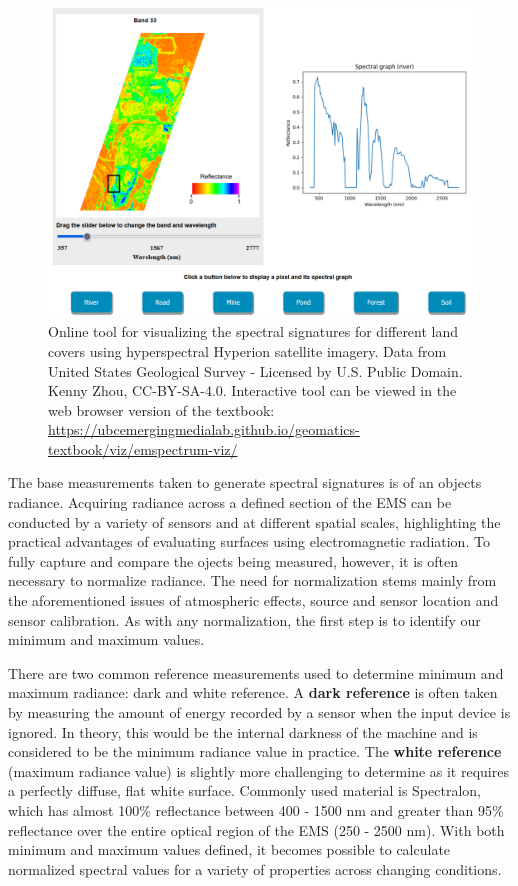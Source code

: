 \documentclass[
]{book}
\begin{document}
\begin{figure}
\includegraphics[width=0.75\linewidth]{images/11-ems-visualization-static} \caption{Online tool for visualizing the spectral signatures for different land covers using hyperspectral Hyperion satellite imagery. Data from United States Geological Survey - Licensed by U.S. Public Domain. Kenny Zhou, CC-BY-SA-4.0. Interactive tool can be viewed in the web browser version of the textbook: \url{https://ubcemergingmedialab.github.io/geomatics-textbook/viz/emspectrum-viz/}}\label{fig:11-ems-visualization-static}
\end{figure}

The base measurements taken to generate spectral signatures is of an objects radiance. Acquiring radiance across a defined section of the EMS can be conducted by a variety of sensors and at different spatial scales, highlighting the practical advantages of evaluating surfaces using electromagnetic radiation. To fully capture and compare the ojects being measured, however, it is often necessary to normalize radiance. The need for normalization stems mainly from the aforementioned issues of atmospheric effects, source and sensor location and sensor calibration. As with any normalization, the first step is to identify our minimum and maximum values.

There are two common reference measurements used to determine minimum and maximum radiance: dark and white reference. A \textbf{dark reference} is often taken by measuring the amount of energy recorded by a sensor when the input device is ignored. In theory, this would be the internal darkness of the machine and is considered to be the minimum radiance value in practice. The \textbf{white reference} (maximum radiance value) is slightly more challenging to determine as it requires a perfectly diffuse, flat white surface. Commonly used material is Spectralon, which has almost 100\% reflectance between 400 - 1500 nm and greater than 95\% reflectance over the entire optical region of the EMS (250 - 2500 nm). With both minimum and maximum values defined, it becomes possible to calculate normalized spectral values for a variety of properties across changing conditions.
\end{document}
